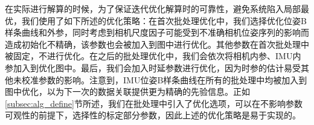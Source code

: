 {\begin{figure}[h]
    \caption{}
    \label{fig:real_world_result}
  \end{figure}
}

在实际进行解算的时候，为了保证迭代优化解算时的可靠性，避免系统陷入局部最优，我们使用了如下所述的优化策略：在首次批处理优化中，我们选择优化位姿B样条曲线和外参，同时考虑到相机尺度因子可能受到不准确相机位姿序列的影响而造成初始化不精确，该参数也会被加入到图中进行优化。其他参数在首次批处理中被固定，不进行优化。在之后的批处理优化中，我们会依次将相机内参、IMU内参加入到优化图中。最后，我们会加入时延参数进行优化，因为时参的估计易受其他未校准参数的影响。注意到，IMU位姿B样条曲线在所有的批处理中均被加入到图中优化，以为下一次的数据关联提供更为精确的先验信息。正如\ref{subsec:alg_define}节所述，我们在批处理中引入了优化选项，可以在不影响参数可观性的前提下，选择性的标定部分参数，因此上述的优化策略是易于实现的。

